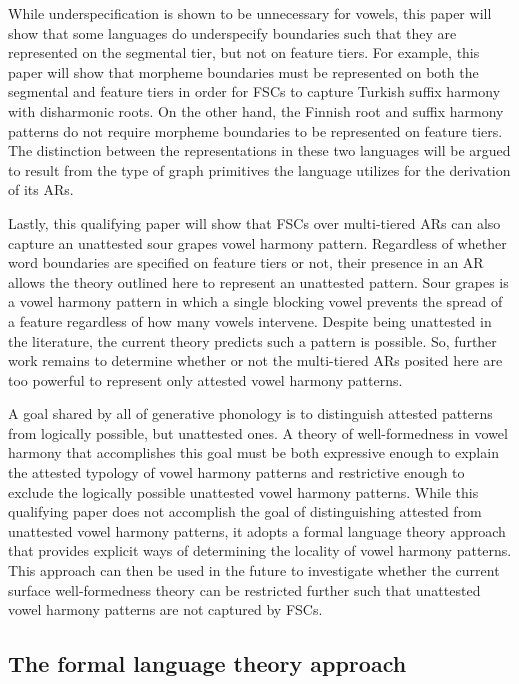 \documentclass[,doc,floatsintext]{apa6}
\theoremstyle{definition}
\theoremstyle{definition}
\theoremstyle{definition}
\theoremstyle{remark}
\begin{document}
While underspecification is shown to be unnecessary for vowels, this
paper will show that some languages do underspecify boundaries such that
they are represented on the segmental tier, but not on feature tiers.
For example, this paper will show that morpheme boundaries must be
represented on both the segmental and feature tiers in order for FSCs to
capture Turkish suffix harmony with disharmonic roots. On the other
hand, the Finnish root and suffix harmony patterns do not require
morpheme boundaries to be represented on feature tiers. The distinction
between the representations in these two languages will be argued to
result from the type of graph primitives the language utilizes for the
derivation of its ARs.

Lastly, this qualifying paper will show that FSCs over multi-tiered ARs
can also capture an unattested sour grapes vowel harmony pattern.
Regardless of whether word boundaries are specified on feature tiers or
not, their presence in an AR allows the theory outlined here to
represent an unattested pattern. Sour grapes is a vowel harmony pattern
in which a single blocking vowel prevents the spread of a feature
regardless of how many vowels intervene. Despite being unattested in the
literature, the current theory predicts such a pattern is possible. So,
further work remains to determine whether or not the multi-tiered ARs
posited here are too powerful to represent only attested vowel harmony
patterns.

A goal shared by all of generative phonology is to distinguish attested
patterns from logically possible, but unattested ones. A theory of
well-formedness in vowel harmony that accomplishes this goal must be
both expressive enough to explain the attested typology of vowel harmony
patterns and restrictive enough to exclude the logically possible
unattested vowel harmony patterns. While this qualifying paper does not
accomplish the goal of distinguishing attested from unattested vowel
harmony patterns, it adopts a formal language theory approach that
provides explicit ways of determining the locality of vowel harmony
patterns. This approach can then be used in the future to investigate
whether the current surface well-formedness theory can be restricted
further such that unattested vowel harmony patterns are not captured by
FSCs.

\subsection{The formal language theory
approach}\label{the-formal-language-theory-approach}
\end{document}
